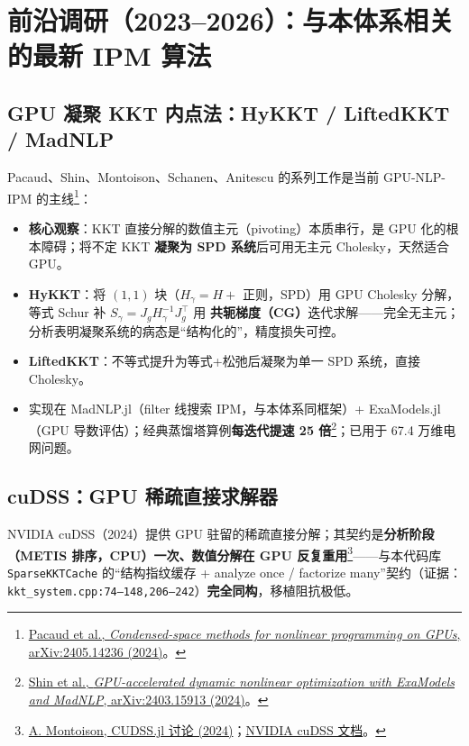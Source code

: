\documentclass[11pt,a4paper]{ctexart}
\newcommand{\file}[1]{\texttt{#1}}
\newcommand{\func}[1]{\texttt{#1}}
\newcommand{\evid}[1]{{\footnotesize\color{black!70}（证据：#1）}}
\begin{document}
\section{前沿调研（2023--2026）：与本体系相关的最新 IPM 算法}

\subsection{GPU 凝聚 KKT 内点法：HyKKT / LiftedKKT / MadNLP}
Pacaud、Shin、Montoison、Schanen、Anitescu 的系列工作是当前 GPU-NLP-IPM 的主线\footnote{\href{https://arxiv.org/abs/2405.14236}{Pacaud et al., \emph{Condensed-space methods for nonlinear programming on GPUs}, arXiv:2405.14236 (2024)}。}：
\begin{itemize}[leftmargin=2em]
  \item \textbf{核心观察}：KKT 直接分解的数值主元（pivoting）本质串行，是 GPU 化的根本障碍；将不定 KKT \textbf{凝聚为 SPD 系统}后可用无主元 Cholesky，天然适合 GPU。
  \item \textbf{HyKKT}：将 $(1,1)$ 块（$H_\gamma = H + $ 正则，SPD）用 GPU Cholesky 分解，等式 Schur 补 $S_\gamma = J_g H_\gamma^{-1} J_g^{\top}$ 用 \textbf{共轭梯度（CG）}迭代求解——完全无主元；分析表明凝聚系统的病态是``结构化的''，精度损失可控。
  \item \textbf{LiftedKKT}：不等式提升为等式+松弛后凝聚为单一 SPD 系统，直接 Cholesky。
  \item 实现在 MadNLP.jl（filter 线搜索 IPM，与本体系同框架）+ ExaModels.jl（GPU 导数评估）；经典蒸馏塔算例\textbf{每迭代提速 25 倍}\footnote{\href{https://arxiv.org/abs/2403.15913}{Shin et al., \emph{GPU-accelerated dynamic nonlinear optimization with ExaModels and MadNLP}, arXiv:2403.15913 (2024)}。}；已用于 67.4 万维电网问题。
\end{itemize}

\subsection{cuDSS：GPU 稀疏直接求解器}
NVIDIA cuDSS（2024）提供 GPU 驻留的稀疏直接分解；其契约是\textbf{分析阶段（METIS 排序，CPU）一次、数值分解在 GPU 反复重用}\footnote{\href{https://discourse.julialang.org/t/sparse-lu-factorization-on-gpu/122012}{A. Montoison, CUDSS.jl 讨论 (2024)}；\href{https://docs.nvidia.com/cuda/cudss/}{NVIDIA cuDSS 文档}。}——与本代码库 \func{SparseKKTCache} 的``结构指纹缓存 + analyze once / factorize many''契约\evid{\file{kkt\_system.cpp:74--148,206--242}}\textbf{完全同构}，移植阻抗极低。
\end{document}
